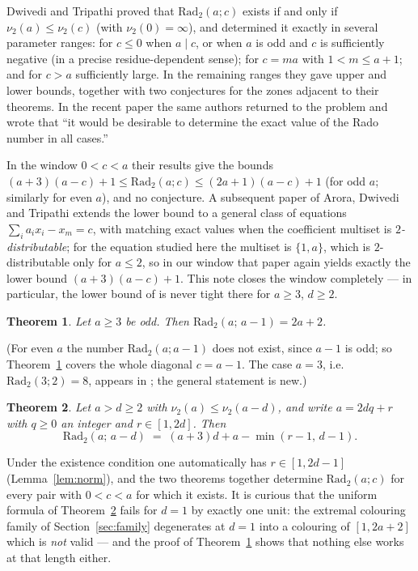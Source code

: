 \documentclass[11pt]{article}
\newtheorem{theorem}{Theorem}
\theoremstyle{remark}
\theoremstyle{definition}
\newcommand{\Rad}{\mathrm{Rad}_2}
\newcommand{\vtwo}{\nu_2}
\begin{document}
Dwivedi and Tripathi proved that $\Rad(a;c)$ exists if and only if
$\vtwo(a) \le \vtwo(c)$ (with $\vtwo(0) = \infty$), and determined it exactly
in several parameter ranges: for $c \le 0$ when $a \mid c$, or when $a$ is odd
and $c$ is sufficiently negative (in a precise residue-dependent sense); for
$c = ma$ with $1 < m \le a+1$; and for $c > a$ sufficiently large. In the
remaining ranges they gave upper and lower bounds, together with two
conjectures for the zones adjacent to their theorems. In the recent paper
\cite{DT2025} the same authors returned to the problem and wrote that
``it would be desirable to determine the exact value of the Rado number in
all cases.''

In the window $0 < c < a$ their results give the bounds
$(a+3)(a-c)+1 \le \Rad(a;c) \le (2a+1)(a-c)+1$ (for odd $a$; similarly for
even $a$), and no conjecture. A subsequent paper of Arora, Dwivedi and
Tripathi \cite{ADT2025} extends the lower bound to a general class of
equations $\sum_i a_i x_i - x_m = c$, with matching exact values when the
coefficient multiset is \emph{$2$-distributable}; for the equation studied
here the multiset is $\{1, a\}$, which is $2$-distributable only for
$a \le 2$, so in our window that paper again yields exactly the lower bound
$(a+3)(a-c)+1$. This note closes the window completely --- in particular,
the lower bound of \cite{DT2020,ADT2025} is never tight there for
$a \ge 3$, $d \ge 2$.

\begin{theorem}\label{thm:d1}
Let $a \ge 3$ be odd. Then $\Rad(a;\,a-1) = 2a+2$.
\end{theorem}

(For even $a$ the number $\Rad(a;a-1)$ does not exist, since $a-1$ is odd;
so Theorem~\ref{thm:d1} covers the whole diagonal $c = a-1$. The case $a=3$,
i.e.\ $\Rad(3;2) = 8$, appears in \cite{DT2020}; the general statement is
new.)

\begin{theorem}\label{thm:main}
Let $a > d \ge 2$ with $\vtwo(a) \le \vtwo(a-d)$, and write $a = 2dq + r$
with $q \ge 0$ an integer and $r \in [1, 2d]$. Then
\[
\Rad(a;\,a-d) \;=\; (a+3)d + a - \min(r-1,\, d-1).
\]
\end{theorem}

Under the existence condition one automatically has $r \in [1, 2d-1]$
(Lemma~\ref{lem:norm}), and the two theorems together determine
$\Rad(a;c)$ for every pair with $0 < c < a$ for which it exists. It is
curious that the uniform formula of Theorem~\ref{thm:main} fails for $d = 1$
by exactly one unit: the extremal colouring family of
Section~\ref{sec:family} degenerates at $d=1$ into a colouring of
$[1, 2a+2]$ which is \emph{not} valid --- and the proof of
Theorem~\ref{thm:d1} shows that nothing else works at that length either.
\end{document}
